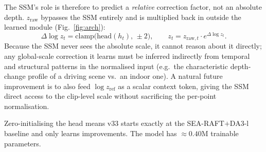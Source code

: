 \documentclass[11pt,a4paper]{article}
\begin{document}
The SSM's role is therefore to predict a \emph{relative} correction factor, not an absolute
depth.  $z_{\text{raw}}$ bypasses the SSM entirely and is multiplied back in outside the learned
module (Fig.~\ref{fig:arch}):
\begin{equation}
\Delta\log z_t = \mathrm{clamp}\big(\mathrm{head}(h_t),\,\pm 2\big),\qquad
z_t = z_{\text{raw},t}\cdot e^{\Delta\log z_t}.
\label{eq:correction}
\end{equation}
Because the SSM never sees the absolute scale, it cannot reason about it directly; any
global-scale correction it learns must be inferred indirectly from temporal and structural
patterns in the normalised input (e.g.\ the characteristic depth-change profile of a driving
scene vs.\ an indoor one).  A natural future improvement is to also feed $\log z_{\text{ref}}$
as a scalar context token, giving the SSM direct access to the clip-level scale without
sacrificing the per-point normalisation.

Zero-initialising the head means v33 starts exactly at the SEA-RAFT$+$DA3-l baseline and only
learns improvements.  The model has $\approx0.40$M trainable parameters.
\end{document}
